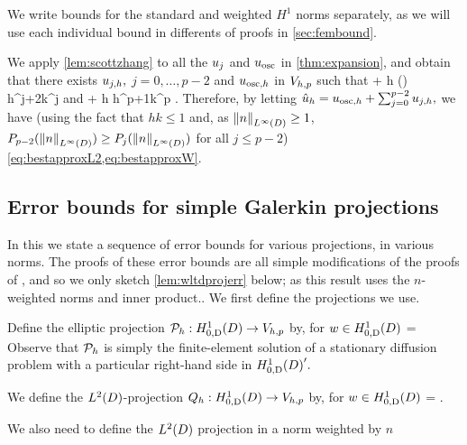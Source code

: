 We write bounds for the standard and weighted $H^1$ norms separately, as we will use each individual bound in differents of proofs in \cref{sec:fembound}.

We apply \cref{lem:scottzhang} to all the $u_{j}$ and $u_{\mathrm{osc}}$ in \cref{thm:expansion}, and obtain that there exists $u_{j,h},$ $j=0,\ldots,p-2$ and $u_{\mathrm{osc},h}$ in $V_{h,p}$ such that 
\beqs
\NLtD{\usj - \ujh} + h\NHoD{\usj - \ujh} \leq {}  \Pj\mleft(\mright) h^{j+2}k^j \Cfg
\eeqs
and
\beqs
\NLtD{\uosc - \uosch} + h\NHoD{\uosc - \uosch} \leq {} \Cosc\CAnk h^{p+1}k^p \Cfg.
\eeqs
Therefore, by letting $\hat{u}_{h} = u_{\mathrm{osc},h} + \sum_{j=0}^{p-2} u_{j,h},$ we have (using the fact that $hk \leq 1$ and, as $\NLiD{n} \geq 1$, $\Pfn{p-2}(\NLiD{n}) \geq \Pfn{j}(\NLiD{n})$ for all $j \leq p-2$) \cref{eq:bestapproxL2,eq:bestapproxW}.
\epf

\subsection{Error bounds for simple Galerkin projections}\label{sec:errgalerkin}
In this  we state a sequence of error bounds for various projections, in various norms. The proofs of these error bounds are all simple modifications of the proofs of \cite[Theorem 5.8.3]{BrSc:08},  and so we only sketch \cref{lem:wltdprojerr} below; as this result uses the $n$-weighted norms and inner product.. %
We first define the projections we use.

Define the elliptic projection $\Ph:\HozDD\rightarrow\Vhp$ by, for $w \in \HozDD$
\beqs
{} =  \tforall \vh \in \Vhp
\eeqs
Observe that $\mathcal P_{h}$ is simply the finite-element solution of a stationary diffusion problem with a particular right-hand side in $\HozDD'.$

We define the $\LtD$-projection $\Qh:\HozDD\rightarrow \Vhp$ by, for $w \in \HozDD$
\beqs
{} =  \tforall \vh \in \Vhp.
\eeqs

We also need to define the $\LtD$ projection in a norm weighted by $n$

